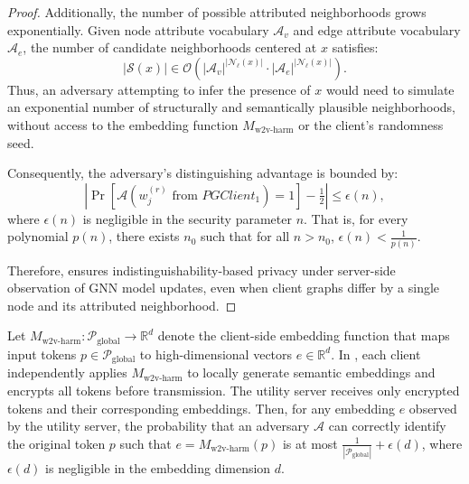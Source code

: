 \begin{proof}
    Additionally, the number of possible attributed neighborhoods grows exponentially. Given node attribute vocabulary \(\mathcal{A}_v\) and edge attribute vocabulary \(\mathcal{A}_e\), the number of candidate neighborhoods centered at \(x\) satisfies:
    \[
    |\mathcal{S}(x)| \in \mathcal{O}\left(|\mathcal{A}_v|^{|\mathcal{N}_\ell(x)|} \cdot |\mathcal{A}_e|^{|\mathcal{N}_\ell(x)|}\right).
    \]
    Thus, an adversary attempting to infer the presence of \(x\) would need to simulate an exponential number of structurally and semantically plausible neighborhoods, without access to the embedding function \(M_{\text{w2v-harm}}\) or the client’s randomness seed.
    
    Consequently, the adversary's distinguishing advantage is bounded by:
    \[
    \left| \Pr[\mathcal{A}(w_j^{(r)} \text{ from } PGClient_1) = 1] - \tfrac{1}{2} \right| \leq \epsilon(n),
    \]
    where \(\epsilon(n)\) is negligible in the security parameter \(n\). That is, for every polynomial \(p(n)\), there exists \(n_0\) such that for all \(n > n_0\), \(\epsilon(n) < \frac{1}{p(n)}\).
    
    Therefore, \Sys ensures indistinguishability-based privacy under server-side observation of GNN model updates, even when client graphs differ by a single node and its attributed neighborhood.
    \end{proof}
    
\begin{theorem}
Let \(M_{\text{w2v-harm}}: \mathcal{P}_{\text{global}} \to \mathbb{R}^d\) denote the client-side embedding function that maps input tokens \(p \in \mathcal{P}_{\text{global}}\) to high-dimensional vectors \(e \in \mathbb{R}^d\). In \Sys, each client independently applies \(M_{\text{w2v-harm}}\) to locally generate semantic embeddings and encrypts all tokens before transmission. The utility server receives only encrypted tokens and their corresponding embeddings. Then, for any embedding \(e\) observed by the utility server, the probability that an adversary \(\mathcal{A}\) can correctly identify the original token \(p\) such that \(e = M_{\text{w2v-harm}}(p)\) is at most \(\frac{1}{|\mathcal{P}_{\text{global}}|} + \epsilon(d)\), where \(\epsilon(d)\) is negligible in the embedding dimension \(d\).
\end{theorem}

